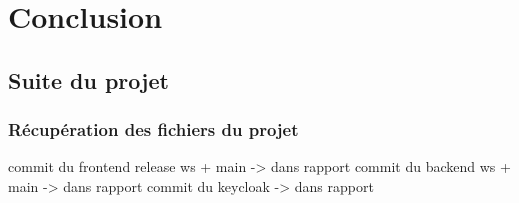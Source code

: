 \documentclass[
    iai, %
    il, %
]{heig-tb}
\begin{document}






\chapter{Conclusion}



\section{Suite du projet}

\subsection{Récupération des fichiers du projet}
commit du frontend release ws + main -> dans rapport %
commit du backend ws + main -> dans rapport %
commit du keycloak -> dans rapport %
\end{document}

